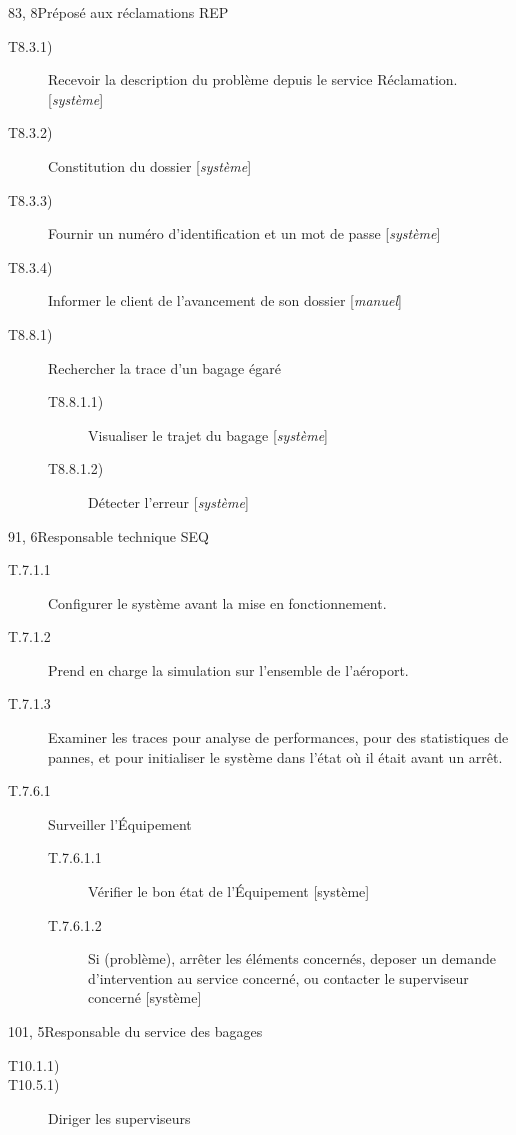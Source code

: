 \dta
{8}{3, 8}{Préposé aux réclamations}
{REP}
{
\begin{description}
	\item [T8.3.1)] Recevoir la description du problème depuis le service \og Réclamation\fg. [\textsl{système}]
	\item [T8.3.2)] Constitution du dossier [\textsl{système}] 
	\item [T8.3.3)] Fournir un numéro d'identification et un mot de passe [\textsl{système}]
	\item [T8.3.4)] Informer le client de l'avancement de son dossier [\textsl{manuel}]

	\item [T8.8.1)] Rechercher la trace d'un bagage égaré
	\begin{description}
		\item [T8.8.1.1)] Visualiser le trajet du bagage [\textsl{système}]
		\item [T8.8.1.2)] Détecter l'erreur [\textsl{système}]
	\end{description}
\end{description}
}

{9}{1, 6}{Responsable technique}
{SEQ}
{
\begin{description}
	\item[T.7.1.1] Configurer le système avant la mise en fonctionnement.
	\item[T.7.1.2] Prend en charge la simulation sur l'ensemble de l'aéroport.
	\item[T.7.1.3] Examiner les traces pour analyse de performances, pour des statistiques de pannes, et pour initialiser le système dans l'état où il était avant un arrêt.

	\item[T.7.6.1] Surveiller l'Équipement
	\begin{description}
		\item[T.7.6.1.1] Vérifier le bon état de l'Équipement [système]
		\item[T.7.6.1.2] Si (problème), arrêter les éléments concernés, deposer un
		demande d'intervention au service concerné, ou contacter le superviseur concerné [système]
	\end{description}
\end{description}
}

\dta
{10}{1, 5}{Responsable du service des bagages}
{
\begin{description}
	\item [T10.1.1)] 
	\item [T10.5.1)] Diriger les superviseurs

\end{description}
}

